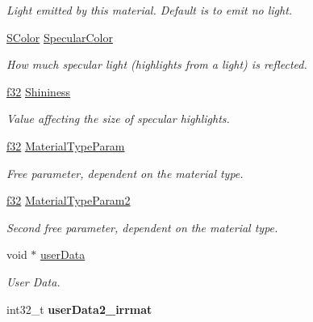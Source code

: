 \begin{DoxyCompactItemize}
\begin{DoxyCompactList}\small\item\em Light emitted by this material. Default is to emit no light. \end{DoxyCompactList}\item 
\hyperlink{classirr_1_1video_1_1SColor}{S\+Color} \hyperlink{classirr_1_1video_1_1SMaterial_a253c2acbafe6698e3d16b3e3a1e199ed}{Specular\+Color}
\begin{DoxyCompactList}\small\item\em How much specular light (highlights from a light) is reflected. \end{DoxyCompactList}\item 
\hyperlink{namespaceirr_a0277be98d67dc26ff93b1a6a1d086b07}{f32} \hyperlink{classirr_1_1video_1_1SMaterial_a877106a83108db6d1f30a38379d28494}{Shininess}
\begin{DoxyCompactList}\small\item\em Value affecting the size of specular highlights. \end{DoxyCompactList}\item 
\hyperlink{namespaceirr_a0277be98d67dc26ff93b1a6a1d086b07}{f32} \hyperlink{classirr_1_1video_1_1SMaterial_aefe0acce491efa8dedcd2b7cb49f8133}{Material\+Type\+Param}
\begin{DoxyCompactList}\small\item\em Free parameter, dependent on the material type. \end{DoxyCompactList}\item 
\hyperlink{namespaceirr_a0277be98d67dc26ff93b1a6a1d086b07}{f32} \hyperlink{classirr_1_1video_1_1SMaterial_a3c4af8e0325a95ff78c3066a497161de}{Material\+Type\+Param2}
\begin{DoxyCompactList}\small\item\em Second free parameter, dependent on the material type. \end{DoxyCompactList}\item 
void $\ast$ \hyperlink{classirr_1_1video_1_1SMaterial_a99703d00c81ffbb5810f45a0ea0a9a9c}{user\+Data}\hypertarget{classirr_1_1video_1_1SMaterial_a99703d00c81ffbb5810f45a0ea0a9a9c}{}\label{classirr_1_1video_1_1SMaterial_a99703d00c81ffbb5810f45a0ea0a9a9c}

\begin{DoxyCompactList}\small\item\em User Data. \end{DoxyCompactList}\item 
int32\+\_\+t {\bfseries user\+Data2\+\_\+irrmat}\hypertarget{classirr_1_1video_1_1SMaterial_a9ffa6f93f858da9e92cf0bc936036305}{}\label{classirr_1_1video_1_1SMaterial_a9ffa6f93f858da9e92cf0bc936036305}


\end{DoxyCompactItemize}
